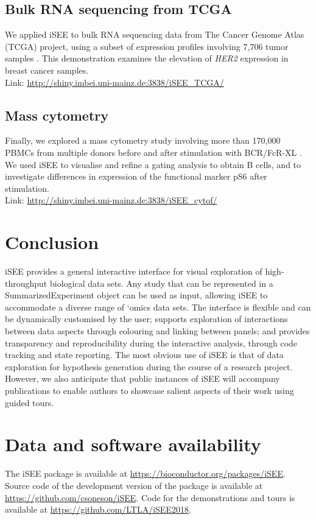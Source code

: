 \documentclass[10pt,a4paper,twocolumn]{article}
\begin{document}
\subsection*{Bulk RNA sequencing from TCGA}
We applied iSEE to bulk RNA sequencing data from The Cancer Genome Atlas (TCGA) project, using a subset of expression profiles involving 7,706 tumor samples \citep{piccolo2015TCGA}.
This demonstration examines the elevation of \textit{HER2} expression in breast cancer samples.\\

Link: \url{http://shiny.imbei.uni-mainz.de:3838/iSEE_TCGA/}

\subsection*{Mass cytometry}
Finally, we explored a mass cytometry study involving more than 170,000 PBMCs from multiple donors before and after stimulation with BCR/FcR-XL \citep{bodenmiller2012cytof}.
We used iSEE to visualise and refine a gating analysis to obtain B cells, and to investigate differences in expression of the functional marker pS6 after stimulation.\\

Link: \url{http://shiny.imbei.uni-mainz.de:3838/iSEE_cytof/}

\section*{Conclusion}
iSEE provides a general interactive interface for visual exploration of high-throughput biological data sets.
Any study that can be represented in a SummarizedExperiment object can be used as input, allowing iSEE to accommodate a diverse range of `omics data sets.
The interface is flexible and can be dynamically customised by the user; supports exploration of interactions between data aspects through colouring and linking between panels;
and provides transparency and reproducibility during the interactive analysis, through code tracking and state reporting. 
The most obvious use of iSEE is that of data exploration for hypothesis generation during the course of a research project.
However, we also anticipate that public instances of iSEE will accompany publications to enable authors to showcase salient aspects of their work using guided tours.

\section*{Data and software availability}
The iSEE package is available at \url{https://bioconductor.org/packages/iSEE}.
Source code of the development version of the package is available at \url{https://github.com/csoneson/iSEE}.
Code for the demonstrations and tours is available at \url{https://github.com/LTLA/iSEE2018}.
\end{document}
